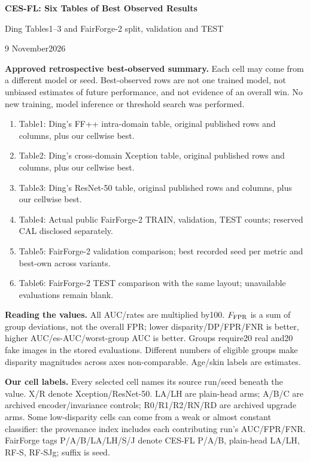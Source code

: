 \documentclass[10pt]{article}
\begin{document}
\begin{center}{\LARGE\bfseries CES-FL: Six Tables of Best Observed Results}\par
\large Ding Tables1--3 and FairForge-2 split, validation and TEST\par
9 November2026\end{center}
\colorbox{blue!8}{\parbox{0.97\linewidth}{\textbf{Approved retrospective best-observed summary.}
Each cell may come from a different model or seed. Best-observed rows are not one trained model,
not unbiased estimates of future performance, and not evidence of an overall win.
No new training, model inference or threshold search was performed.}}
\begin{enumerate}
\item Table1: Ding's FF++ intra-domain table, original published rows and columns, plus our cellwise best.
\item Table2: Ding's cross-domain Xception table, original published rows and columns, plus our cellwise best.
\item Table3: Ding's ResNet-50 table, original published rows and columns, plus our cellwise best.
\item Table4: Actual public FairForge-2 TRAIN, validation, TEST counts; reserved CAL disclosed separately.
\item Table5: FairForge-2 validation comparison; best recorded seed per metric and best-own across variants.
\item Table6: FairForge-2 TEST comparison with the same layout; unavailable evaluations remain blank.
\end{enumerate}
\textbf{Reading the values.} All AUC/rates are multiplied by100. $F_{\rm FPR}$ is a sum of group deviations,
not the overall FPR; lower disparity/DP/FPR/FNR is better, higher AUC/es-AUC/worst-group AUC is better.
Groups require20 real and20 fake images in the stored evaluations. Different numbers of eligible groups make
disparity magnitudes across axes non-comparable. Age/skin labels are estimates.
\par\textbf{Our cell labels.} Every selected cell names its source run/seed beneath the value.
X/R denote Xception/ResNet-50. LA/LH are plain-head arms; A/B/C are archived encoder/invariance controls;
R0/R1/R2/RN/RD are archived upgrade arms. Some low-disparity cells can come from a weak or almost constant
classifier: the provenance index includes each contributing run's AUC/FPR/FNR.
FairForge tags P/A/B/LA/LH/S/J denote CES-FL P/A/B, plain-head LA/LH, RF-S, RF-SJg; suffix is seed.
\end{document}
